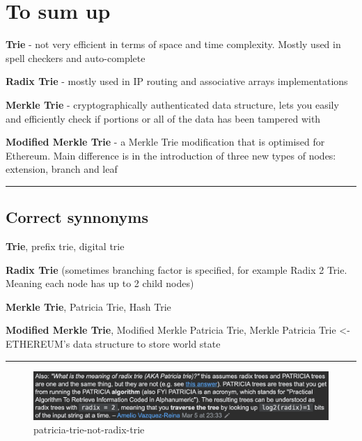 \documentclass[11pt]{article}
\begin{document}
\hypertarget{to-sum-up}{%
\section{To sum up}\label{to-sum-up}}

\textbf{Trie} - not very efficient in terms of space and time
complexity. Mostly used in spell checkers and auto-complete

\textbf{Radix Trie} - mostly used in IP routing and associative arrays
implementations

\textbf{Merkle Trie} - cryptographically authenticated data structure,
lets you easily and efficiently check if portions or all of the data has
been tampered with

\textbf{Modified Merkle Trie} - a Merkle Trie modification that is
optimised for Ethereum. Main difference is in the introduction of three
new types of nodes: extension, branch and leaf

\begin{center}\rule{0.5\linewidth}{0.5pt}\end{center}

    \hypertarget{correct-synnonyms}{%
\subsection{Correct synnonyms}\label{correct-synnonyms}}

\textbf{Trie}, prefix trie, digital trie

\textbf{Radix Trie} (sometimes branching factor is specified, for
example Radix 2 Trie. Meaning each node has up to 2 child nodes)

\textbf{Merkle Trie}, Patricia Trie, Hash Trie

\textbf{Modified Merkle Trie}, Modified Merkle Patricia Trie, Merkle
Patricia Trie \textless- ETHEREUM's data structure to store world state

\begin{center}\rule{0.5\linewidth}{0.5pt}\end{center}

    \begin{figure}
\centering
\includegraphics{../static/patricia-is-radix.png}
\caption{patricia-trie-not-radix-trie}
\end{figure}
\end{document}
